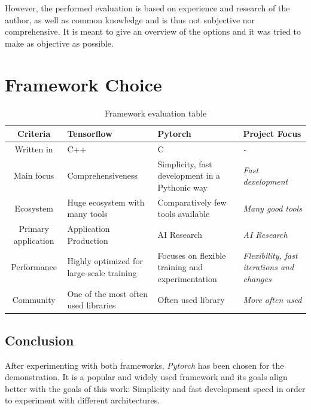 \documentclass[12pt, a4paper, titlepage]{report}
\begin{document}
However, the performed evaluation is based on experience and research of the author, as well as common knowledge and is thus not subjective nor comprehensive. It is meant to give an overview of the options and it was tried to make as objective as possible.



\section{Framework Choice}

\begin{table}
   \begin{tabular} {|c||p{4.0cm}|p{4.0cm}||p{3.0cm}|}
      \hline
      \textbf{Criteria}          & \textbf{Tensorflow} & \textbf{Pytorch} & \textbf{Project Focus} \\
      \hline
      Written in           & C++ & C & \emph{-} \\ \hline
      Main focus           & Comprehensiveness & Simplicity, fast development in a Pythonic way & \emph{Fast development} \\ \hline
      Ecosystem            & Huge ecosystem with many tools & Comparatively few tools available & \emph{Many good tools} \\ \hline
      Primary application  & Application Production & AI Research & \emph{AI Research} \\ \hline
      Performance          & Highly optimized for large-scale training & Focuses on flexible training and experimentation & \emph{Flexibility, fast iterations and changes} \\ \hline
      Community            & One of the most often used libraries & Often used library & \emph{More often used} \\ \hline
      \hline
   \end{tabular}
   \caption{Framework evaluation table}
   \label{table:framework_evaluation}
\end{table}

\subsection{Conclusion}

After experimenting with both frameworks, \emph{Pytorch} has been chosen for the demonstration. It is a popular and widely used framework and its goals align better with the goals of this work: Simplicity and fast development speed in order to experiment with different architectures.
\vspace{0.5cm}
\end{document}
